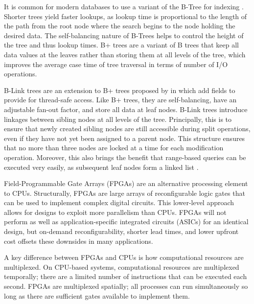 
\label{sec:indexing}

It is common for modern databases to use a variant of the B-Tree for indexing
\autocite{ma-tpds-2022}. Shorter trees yield faster lookups, as lookup time is
proportional to the length of the path from the root node where the search
begins to the node holding the desired data. The self-balancing nature of
B-Trees helps to control the height of the tree and thus lookup times. B+ trees
are a variant of B trees that keep all data values at the leaves rather than
storing them at all levels of the tree, which improves the average case time of
tree traversal in terms of number of I/O operations.

B-Link trees are an extension to B+ trees proposed by \citeauthor{b-link} in
\citeyear{b-link} which add fields to provide for thread-safe access. Like B+
trees, they are self-balancing, have an adjustable fan-out factor, and store all
data at leaf nodes. B-Link trees introduce linkages between sibling nodes at all
levels of the tree. Principally, this is to ensure that newly created sibling
nodes are still accessible during split operations, even if they have not yet
been assigned to a parent node. This structure ensures that no more than three
nodes are locked at a time for each modification operation. Moreover, this also
brings the benefit that range-based queries can be executed very easily, as
subsequent leaf nodes form a linked list \autocite{b-link}.


\label{sec:fpga}

Field-Programmable Gate Arrays (FPGAs) are an alternative processing element to
CPUs. Structurally, FPGAs are large arrays of reconfigurable logic gates that
can be used to implement complex digital circuits. This lower-level approach
allows for designs to exploit more parallelism than CPUs. FPGAs will not perform
as well as application-specific integrated circuits (ASICs) for an identical
design, but on-demand reconfigurability, shorter lead times, and lower upfront
cost offsets these downsides in many applications.

A key difference between FPGAs and CPUs is how computational resources are
multiplexed. On CPU-based systems, computational resources are multiplexed
temporally; there are a limited number of instructions that can be executed each
second. FPGAs are multiplexed spatially; all processes can run simultaneously so
long as there are sufficient gates available to implement them.


